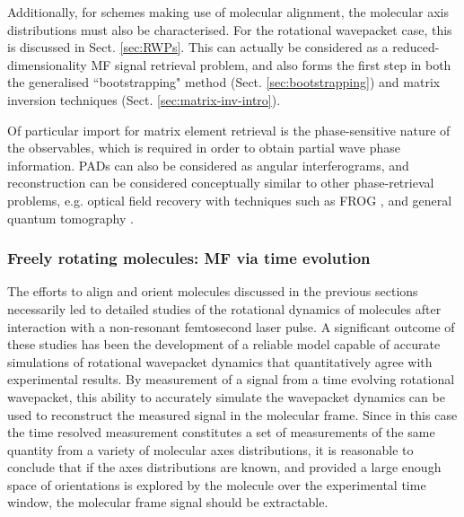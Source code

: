 \documentclass[10pt]{article}
\begin{document}
Additionally, for schemes making use of molecular alignment, the molecular axis distributions must also be characterised. For the rotational wavepacket case, this is discussed in Sect. \ref{sec:RWPs}. This can actually be considered as a reduced-dimensionality MF signal retrieval problem, and also forms the first step in both the generalised ``bootstrapping" method (Sect. \ref{sec:bootstrapping}) and matrix inversion techniques (Sect. \ref{sec:matrix-inv-intro}).

Of particular import for matrix element retrieval is the phase-sensitive nature of the observables, which is required in order to obtain partial wave phase information. PADs can also be considered as angular interferograms, and reconstruction can be considered conceptually similar to other phase-retrieval problems, e.g. optical field recovery with techniques such as FROG \cite{trebino2000FrequencyResolvedOpticalGating}, and general quantum tomography \cite{MauroDAriano2003}. 



\subsubsection{Freely rotating molecules: MF via time evolution\label{sec:RWPs}}

The efforts to align and orient molecules discussed in the previous sections necessarily led to detailed studies of the rotational dynamics of molecules after interaction with a non-resonant femtosecond laser pulse. A significant outcome of these studies has been the development of a reliable model capable of accurate simulations of rotational wavepacket dynamics that quantitatively agree with experimental results. By measurement of a signal from a time evolving rotational wavepacket, this ability to accurately simulate the wavepacket dynamics can be used to reconstruct the measured signal in the molecular frame. Since in this case the time resolved measurement constitutes a set of measurements of the same quantity from a variety of molecular axes distributions, it is reasonable to conclude that if the axes distributions are known, and provided a large enough space of orientations is explored by the molecule over the experimental time window, the molecular frame signal should be extractable. 
\end{document}
